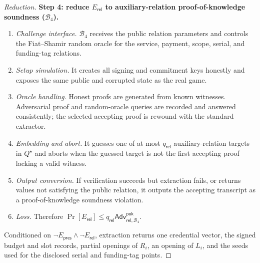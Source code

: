 \documentclass[letterpaper]{article}
\newcommand{\Adv}{\mathsf{Adv}}
\begin{document}
\begin{proof}[Reduction]
\textbf{Step 4: reduce \(E_{\mathsf{rel}}\) to auxiliary-relation
proof-of-knowledge soundness (\(\mathcal B_4\)).}
\begin{enumerate}
  \item \emph{Challenge interface.} \(\mathcal B_4\) receives the public
  relation parameters and controls the Fiat--Shamir random oracle for the
  service, payment, scope, serial, and funding-tag relations.
  \item \emph{Setup simulation.} It creates all signing and commitment keys
  honestly and exposes the same public and corrupted state as the real game.
  \item \emph{Oracle handling.} Honest proofs are generated from known
  witnesses. Adversarial proof and random-oracle queries are recorded and
  answered consistently; the selected accepting proof is rewound with the
  standard extractor.
  \item \emph{Embedding and abort.} It guesses one of at most
  \(q_{\mathsf{rel}}\) auxiliary-relation targets in \(Q^\star\) and aborts when
  the guessed target is not the first accepting proof lacking a valid witness.
  \item \emph{Output conversion.} If verification succeeds but extraction
  fails, or returns values not satisfying the public relation, it outputs the
  accepting transcript as a proof-of-knowledge soundness violation.
  \item \emph{Loss.} Therefore
  \(\Pr[E_{\mathsf{rel}}]\le
  q_{\mathsf{rel}}\Adv^{\mathsf{pok}}_{\mathsf{rel},\mathcal B_4}\).
\end{enumerate}
Conditioned on \(\neg E_{\mathsf{pres}}\wedge\neg E_{\mathsf{rel}}\), extraction
returns one credential vector, the signed budget and slot records, partial
openings of \(R_i\), an opening of \(L_i\), and the seeds used for the disclosed
serial and funding-tag points.


\end{proof}
\end{document}
